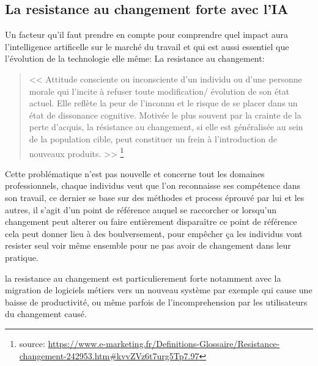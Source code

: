     
    \newpage
    \subsection*{La resistance au changement forte avec l'IA}
        Un facteur qu'il faut prendre en compte pour comprendre quel impact aura l'intelligence artificelle
        sur le marché du travail et qui est aussi essentiel que l'évolution de la technologie elle même:
        La resistance au changement: 
        \newline
        \begin{quote}
            << Attitude consciente ou inconsciente d’un individu ou d’une personne morale qui l’incite 
            à refuser toute modification/ évolution de son état actuel. 
            Elle reflète la peur de l’inconnu et le risque de se placer dans un état 
            de dissonance cognitive. Motivée le plus souvent par la crainte de la perte d’acquis, 
            la résistance au changement, si elle est généralisée au sein de la population cible, 
            peut constituer un frein à l’introduction de nouveaux produits. >> 
            \footnote{source: \url{https://www.e-marketing.fr/Definitions-Glossaire/Resistance-changement-242953.htm\#kvvZVz6t7urg5Tp7.97}}
            \newline 
        \end{quote}

        Cette problématique n'est pas nouvelle et concerne tout les domaines professionnels,
        chaque individus veut que l'on reconnaisse ses compétence dans son travail, ce dernier se 
        base sur des méthodes et process éprouvé par lui et les autres, il s'agit d'un point 
        de référence auquel se raccorcher or lorsqu'un changement peut alterer ou faire 
        entièrement disparaître ce point de référence cela peut donner lieu à des boulversement,
        pour empêcher ça les individus vont resister seul voir même ensemble pour ne pas 
        avoir de changement dans leur pratique.

        la resistance au changement est particulierement forte notamment avec la  migration 
        de logiciels métiers vers un nouveau système par exemple qui cause une baisse de productivité,
        ou même parfois de l'incomprehension par les utilisateurs du changement causé. 
        \newline

